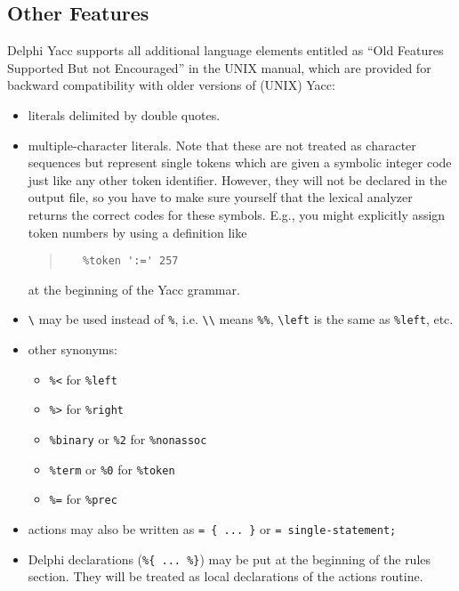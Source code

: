 \documentclass[a4paper]{article}
\begin{document}
\subsection{Other Features}

Delphi Yacc supports all additional language elements entitled as ``Old Features
Supported But not Encouraged'' in the UNIX manual, which are provided for
backward compatibility with older versions of (UNIX) Yacc:

\begin{itemize}
   \item
      literals delimited by double quotes.
   \item
      multiple-character literals. Note that these are not treated as
      character sequences but represent single tokens which are given a
      symbolic integer code just like any other token identifier. However,
      they will not be declared in the output file, so you have to make sure
      yourself that the lexical analyzer returns the correct codes for these
      symbols. E.g., you might explicitly assign token numbers by using a
      definition like
      \begin{quote}\begin{verbatim}
   %token ':=' 257
      \end{verbatim}\end{quote}
      at the beginning of the Yacc grammar.
   \item
      \verb"\" may be used instead of \verb"%", i.e. \verb"\\" means
      \verb"%%", \verb"\left" is the same as \verb"%left", etc.
   \item
      other synonyms:
      \begin{itemize}
         \item \verb"%<"                    for \verb"%left"
         \item \verb"%>"                    for \verb"%right"
         \item \verb"%binary" or \verb"%2"  for \verb"%nonassoc"
         \item \verb"%term" or \verb"%0"    for \verb"%token"
         \item \verb"%="                    for \verb"%prec"
      \end{itemize}
   \item
      actions may also be written as \verb"= { ... }" or
      \verb"= single-statement;"
   \item
      Delphi declarations (\verb"%{ ... %}") may be put at the
      beginning of the rules section. They will be treated as local
      declarations of the actions routine.
\end{itemize}
\end{document}

